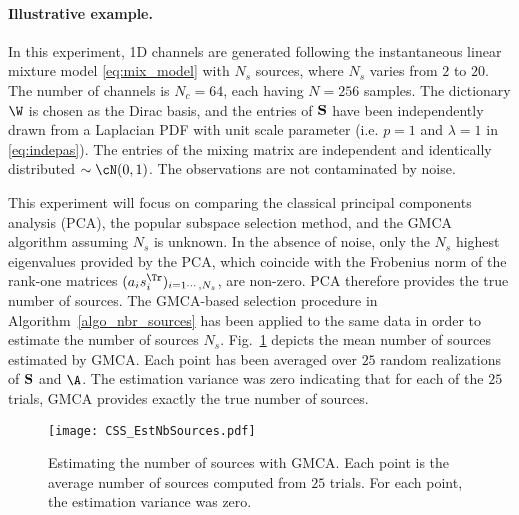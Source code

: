 \paragraph*{Illustrative example.}
In this experiment, 1D channels are generated following the instantaneous linear mixture model \eqref{eq:mix_model} with $N_s$ sources, where $N_s$ varies from $2$ to $20$. The number of channels is $N_c= 64$, each having $N = 256$ samples. The dictionary $\W$ is chosen as the Dirac basis, and the entries of $\bf S$ have been independently drawn from a Laplacian PDF with unit scale parameter (i.e. $p=1$ and $\lambda=1$ in \eqref{eq:indepas}). The entries of the mixing matrix are independent and identically distributed $\sim \cN(0,1)$. The observations are not contaminated by noise.  

This experiment will focus on comparing the classical principal components analysis (PCA), the popular subspace selection method, and the GMCA algorithm assuming $N_s$ is unknown. In the absence of noise, only the $N_s$ highest eigenvalues provided by the PCA, which coincide with the Frobenius norm of the rank-one matrices $(a_i s_i^\Tr)_{i=1\cdots,N_s}$, are non-zero. PCA therefore provides the true number of sources. The GMCA-based selection procedure in Algorithm~\ref{algo_nbr_sources} has been applied to the same data in order to estimate the number of sources $N_s$. Fig.\ \ref{fig:css_ns} depicts the mean number of sources estimated by GMCA. Each point has been averaged over $25$ random realizations of $\bf S$ and $\A$. The estimation variance was zero indicating that for each of the $25$ trials, GMCA provides exactly the true number of sources.

\begin{figure}[htb]
\begin{minipage}[b]{1\linewidth}
    \centerline{
    \texttt{[image: CSS\_EstNbSources.pdf]}
    }
\end{minipage}
\caption{Estimating the number of sources with GMCA. Each point is the average number of sources computed from $25$ trials. For each point, the estimation variance was zero.} \label{fig:css_ns}
\end{figure} 

